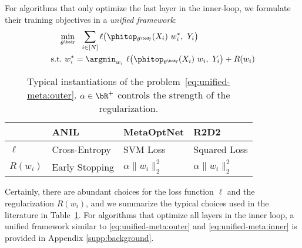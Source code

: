 \documentclass{article}
\begin{document}
For algorithms that only optimize the last layer in the inner-loop, we formulate their training objectives in a \textit{unified framework}:
\begin{align}
    & \quad   \min_{\theta^\body} ~~ \sum_{i\in[N]} \ell \big(\phitop_{\theta^\body}(X_{i})~w_i^*, ~Y_{i}\big) \label{eq:unified-meta:outer}\\
    &   \text{s.t.} ~w_i^* = \argmin_{w_i} ~\ell \big(\phitop_{\theta^\body}(X_{i})~w_i, ~Y_{i}\big) + R(w_i)\label{eq:unified-meta:inner}
\end{align}
\begin{table}[tb]
\vspace*{-1em}
\centering
\caption{Typical instantiations of the problem~\eqref{eq:unified-meta:outer}. $\alpha \in \bR^+$ controls the strength of the regularization.}
\label{tab:instan}
\vspace{+5pt}
\begin{tabular}{*4l}
\toprule
              & ANIL & MetaOptNet         & R2D2               \\
\midrule
$\ell$        & Cross-Entropy & SVM Loss            & Squared Loss          \\
\midrule
$R(w_i)$ & Early Stopping & $\alpha\|w_i\|_2^2$ & $\alpha\|w_i\|_2^2$\\
\bottomrule
\end{tabular}
\end{table}

Certainly, there are abundant choices for the loss function $\ell$ and the regularization $R(w_i)$, and we summarize the typical choices used in the literature in Table~\ref{tab:instan}. For algorithms that optimize all layers in the inner loop, a unified framework similar to \eqref{eq:unified-meta:outer} and \eqref{eq:unified-meta:inner} is provided in Appendix \ref{supp:background}.
\end{document}
